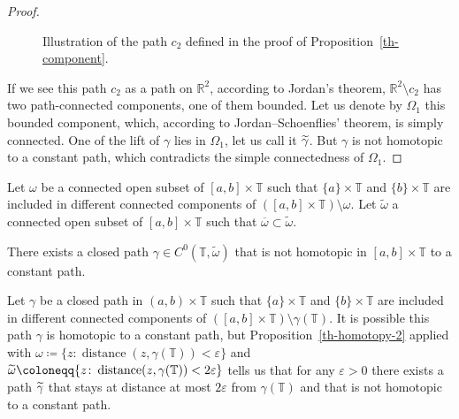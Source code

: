 \documentclass[AHL,Unicode,longabstracts,published]{cedram}
\newcommand{\1}{\mathds 1}
\DeclareMathOperator{\distance}{distance}
\newcommand{\R}{\mathbb{R}}
\newcommand{\T}{\mathbb{T}}
\newcommand{\g}{\gamma}
\newcommand{\e}{\varepsilon}
\renewcommand{\o}{\omega}
\renewcommand{\O}{\Omega}
\let\oldtilde\tilde
\renewcommand*{\tilde}[1]{\mathchoice{\widetilde{#1}}{\widetilde{#1}}{\oldtilde{#1}}{\oldtilde{#1}}}
\renewcommand{\o}{\omega}
\begin{document}
\begin{proof}
\begin{figure}[ht]
\caption{Illustration of the path $c_2$ defined in the proof of Proposition~\ref{th-component}.}\label{fig:covering}
\end{figure}

If we see this path $c_2$ as a path on $\R^2$, according to Jordan's theorem, $\R^2\setminus c_2$ has two path-connected components, one of them bounded. Let us denote by $\O_1$ this bounded component, which, according to Jordan--Schoenflies' theorem, is simply connected. One of the lift of $\g$ lies in $\O_1$, let us call it $\tilde \g$. But $\g$ is not homotopic to a constant path, which contradicts the simple connectedness of $\O_1$.
\end{proof}

\begin{prop}\label{th-homotopy-2}
Let $\o$ be a connected open subset of $[a,b]\times \T$ such that $\{a\}\times \T$ and $\{b\}\times \T$ are included in different connected components of $([a,b]\times\T) \setminus \o$. Let $\widetilde \o$ a connected open subset of $[a,b]\times \T$ such that $\overline \o \subset \widetilde
\o$.

There exists a closed path $\g \in C^0(\T,\widetilde \o)$ that is not homotopic in $[a,b]\times \T$ to a constant path.
\end{prop}

\begin{rema}\label{rk-homotopy-2}
Let $\g$ be a closed path in $(a,b) \times \T$ such that $\{a\}\times \T$ and $\{b\}\times \T$ are included in different connected components of $([a,b]\times\T) \setminus \g(\T)$. It is possible this path $\g$ is homotopic to a constant path, but Proposition~\ref{th-homotopy-2} applied with $\o \coloneqq \{z\colon \distance(z,\g(\T)) < \e\}$ and $\tilde \o \coloneqq \{z\colon \distance(z,\g(\T)) < 2\e\}$ tells us that for any $\e > 0$ there exists a path $\tilde \g$ that stays at distance at most $2\e$ from $\g(\T)$ and that is not homotopic to a constant path.
\end{rema}
\end{document}
